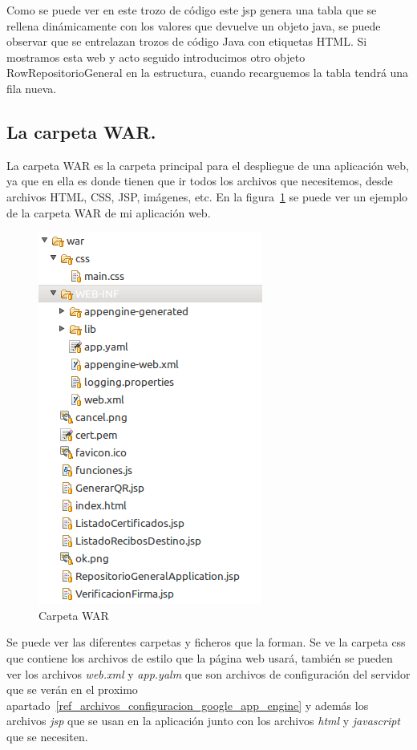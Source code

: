 Como se puede ver en este trozo de código este jsp genera una tabla que se rellena dinámicamente con los valores que devuelve un objeto java, se puede observar que se entrelazan trozos de código Java con etiquetas HTML. Si mostramos esta web y acto seguido introducimos otro objeto RowRepositorioGeneral en la estructura, cuando recarguemos la tabla tendrá una fila nueva.

\subsection{La carpeta WAR.}
La carpeta WAR es la carpeta principal para el despliegue de una aplicación web, ya que en ella es donde tienen que ir todos los archivos que necesitemos, desde archivos HTML, CSS, JSP, imágenes, etc. En la figura~\ref{fig:carpetawar} se puede ver un ejemplo de la carpeta WAR de mi aplicación web.

\begin{figure}
  \centering
    \includegraphics{./GoogleAppEngine/imagenes/carpetawar.png}
  \caption{Carpeta WAR}
  \label{fig:carpetawar}
\end{figure}

Se puede ver las diferentes carpetas y ficheros que la forman. Se ve la carpeta css que contiene los archivos de estilo que la página web usará, también se pueden ver los archivos \textit{web.xml} y \textit{app.yalm} que son archivos de configuración del servidor que se verán en el proximo apartado~\ref{ref_archivos_configuracion_google_app_engine} y además los archivos \textit{jsp} que se usan en la aplicación junto con los archivos \textit{html} y \textit{javascript} que se necesiten.


